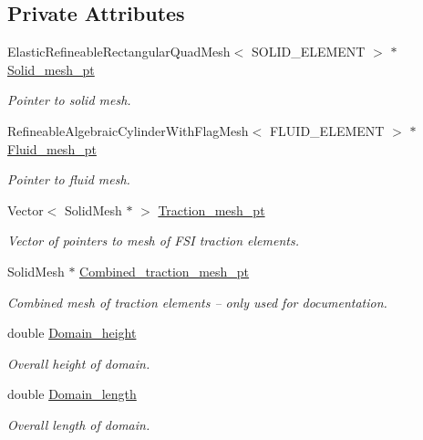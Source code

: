 \subsection*{Private Attributes}
\begin{DoxyCompactItemize}
\item 
Elastic\+Refineable\+Rectangular\+Quad\+Mesh$<$ S\+O\+L\+I\+D\+\_\+\+E\+L\+E\+M\+E\+NT $>$ $\ast$ \hyperlink{classTurekProblem_a1a449088ae3cc96ade1c58979294afed}{Solid\+\_\+mesh\+\_\+pt}
\begin{DoxyCompactList}\small\item\em Pointer to solid mesh. \end{DoxyCompactList}\item 
Refineable\+Algebraic\+Cylinder\+With\+Flag\+Mesh$<$ F\+L\+U\+I\+D\+\_\+\+E\+L\+E\+M\+E\+NT $>$ $\ast$ \hyperlink{classTurekProblem_a18a0daace5dc50db4b93879e4a600e6a}{Fluid\+\_\+mesh\+\_\+pt}
\begin{DoxyCompactList}\small\item\em Pointer to fluid mesh. \end{DoxyCompactList}\item 
Vector$<$ Solid\+Mesh $\ast$ $>$ \hyperlink{classTurekProblem_a0b8588d0f133ffb9a281c5747786f95f}{Traction\+\_\+mesh\+\_\+pt}
\begin{DoxyCompactList}\small\item\em Vector of pointers to mesh of F\+SI traction elements. \end{DoxyCompactList}\item 
Solid\+Mesh $\ast$ \hyperlink{classTurekProblem_ac61477b19dfaaba6fb2c7a5c72240ac6}{Combined\+\_\+traction\+\_\+mesh\+\_\+pt}
\begin{DoxyCompactList}\small\item\em Combined mesh of traction elements -- only used for documentation. \end{DoxyCompactList}\item 
double \hyperlink{classTurekProblem_a24d68af05e815f7164e30f53ce7357ce}{Domain\+\_\+height}
\begin{DoxyCompactList}\small\item\em Overall height of domain. \end{DoxyCompactList}\item 
double \hyperlink{classTurekProblem_aff485942ff327ccfcafd3608910ef635}{Domain\+\_\+length}
\begin{DoxyCompactList}\small\item\em Overall length of domain. \end{DoxyCompactList}\item 

\end{DoxyCompactItemize}
